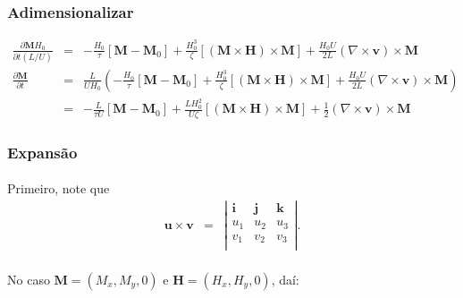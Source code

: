 \documentclass[eletromagnetismo.tex]{subfiles}
\begin{document}
\subsubsection{Adimensionalizar}
\begin{eqnarray}
\frac{\partial \mathbf{M} H_0}{\partial t(L/U)} &=& -\frac{H_0}{\tau}[\mathbf{M} - \mathbf{M}_0]+\frac{H_0^3}{\zeta}[(\mathbf{M}\times \mathbf{H})\times\mathbf{M}]+\frac{H_0 U}{2L}(\nabla\times \mathbf{v})\times \mathbf{M}\\
\frac{\partial \mathbf{M}}{\partial t} &=& \frac{L}{U H_0}\left(-\frac{H_0}{\tau}[\mathbf{M} - \mathbf{M}_0]+\frac{H_0^3}{\zeta}[(\mathbf{M}\times \mathbf{H})\times\mathbf{M}]+\frac{H_0 U}{2L}(\nabla\times \mathbf{v})\times \mathbf{M}\right) \nonumber\\
&=&-\frac{L}{\tau U}[\mathbf{M} - \mathbf{M}_0]+\frac{L H_0^2}{U\zeta}[(\mathbf{M}\times \mathbf{H})\times\mathbf{M}]+\frac{1}{2}(\nabla\times \mathbf{v})\times \mathbf{M}\label{dMdtadimensional}
\end{eqnarray}

\subsubsection{Expansão}
\paragraph{} Primeiro, note que \begin{eqnarray}
	\mathbf{u}\times \mathbf{v} & = & \left| \begin{array}{ccc}
 	\mathbf{i} & \mathbf{j} & \mathbf{k}\\
 	u_1 & u_2 & u_3\\
 	v_1 & v_2 & v_3\\
 \end{array}
 \right|.
\end{eqnarray}
\paragraph{} No caso $\mathbf{M}=(M_x, M_y, 0)$ e $\mathbf{H}=(H_x, H_y, 0)$, daí:
\end{document}
